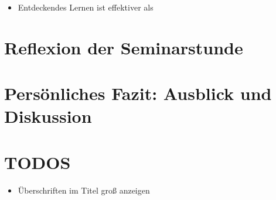 \documentclass[jour,12pt,a4paper]{apa6}
\begin{document}
\begin{itemize}
  \item Entdeckendes Lernen ist effektiver als 
\end{itemize}

\section{Reflexion der Seminarstunde}

\section{Persönliches Fazit: Ausblick und Diskussion}

\section{TODOS}

\begin{itemize}
  \item Überschriften im Titel groß anzeigen
\end{itemize}

\printbibliography
\end{document}
